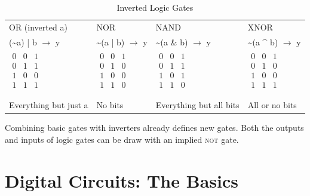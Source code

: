 \documentclass[12pt, a4paper, oneside]{memoir}
\renewcommand{\lnot}{\textasciitilde{}}
\begin{document}
\begin{table}[h]
  \caption{Inverted Logic Gates}
  \centering
  \begin{tabularx}{\textwidth}{YYYY}
    OR (inverted a) & NOR & NAND & XNOR \\
    (\lnot{}a) | b $\rightarrow$ y & \textasciitilde{}(a | b) $\rightarrow$ y & \textasciitilde{}(a \& b) $\rightarrow$ y & \textasciitilde{}(a \textasciicircum{} b) $\rightarrow$ y \\
    \midrule
    $\begin{array}{cc|c} 0 & 0 & 1 \\ 0 & 1 & 1 \\ 1 & 0 & 0 \\ 1 & 1 & 1 \\ \end{array}$ &
    $\begin{array}{cc|c} 0 & 0 & 1 \\ 0 & 1 & 0 \\ 1 & 0 & 0 \\ 1 & 1 & 0 \\ \end{array}$ &
    $\begin{array}{cc|c} 0 & 0 & 1 \\ 0 & 1 & 1 \\ 1 & 0 & 1 \\ 1 & 1 & 0 \\ \end{array}$ &
    $\begin{array}{cc|c} 0 & 0 & 1 \\ 0 & 1 & 0 \\ 1 & 0 & 0 \\ 1 & 1 & 1 \\ \end{array}$ \\
    \midrule
      &   &   &   \\
    \midrule
    Everything but just a & No bits & Everything but all bits & All or no bits \\
  \end{tabularx}
\end{table}
\noindent
Combining basic gates with inverters already defines new gates. Both the outputs and inputs of logic gates can be draw with an implied \textsc{not} gate.

\chapter*{Digital Circuits: The Basics}
\end{document}
